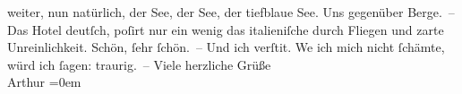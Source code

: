 \begin{ledgroupsized}[t]{13cm}
               weiter, nun natürlich, der See, der See, der tiefblaue See. Uns gegenüber Berge. – Das Hotel deutſch, poſirt nur ein
               wenig das italieniſche durch Fliegen und zarte
               Unreinlichkeit. Schön, ſehr ſchön. – Und ich verſti{\geminationm}t.
                  We{\geminationn} ich mich nicht ſchämte, würd ich ſagen:
               traurig. –\pend
           \pstart
           Viele herzliche Grüße{\\[\baselineskip]}\spacefill\mbox{Arthur}\pend
           \leftskip=0em{}
         
         \endnumbering{}\end{ledgroupsized}  \newcommand{\dateiname}{L00123}\newcommand{\titel}{Arthur Schnitzler an Richard Beer-Hofmann, 13. 9. 1892}\newcommand{\editorInnen}{Martin Anton Müller und Gerd-Hermann Susen}
      